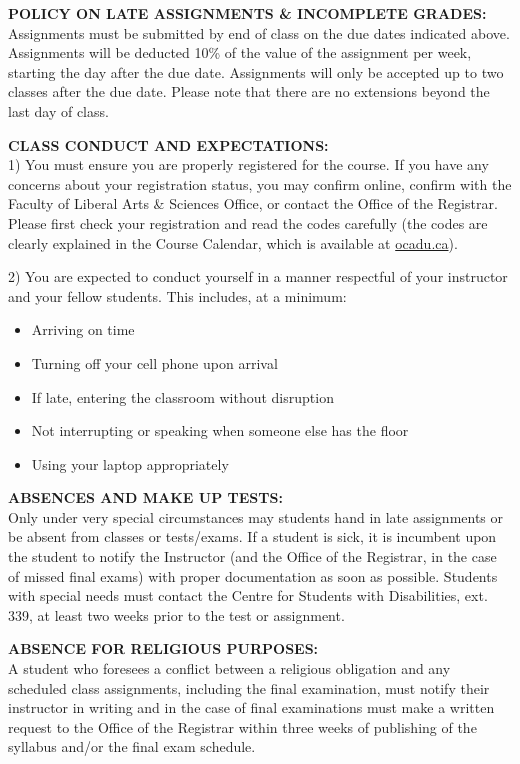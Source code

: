 \documentclass[10pt]{article}
\begin{document}
\textbf{POLICY ON LATE ASSIGNMENTS \& INCOMPLETE GRADES:}\\
Assignments must be submitted by end of class on the due dates indicated above. Assignments will be deducted 10\% of the value of the assignment per week, starting the day after the due date. Assignments will only be accepted up to two classes after the due date. Please note that there are no extensions beyond the last day of class.

\textbf{CLASS CONDUCT AND EXPECTATIONS:}\\
1) You must ensure you are properly registered for the course. If you have any concerns about your registration status, you may confirm online, confirm with the Faculty of Liberal Arts \& Sciences Office, or contact the Office of the Registrar. Please first check your registration and read the codes carefully (the codes are clearly explained in the Course Calendar, which is available at \href{http://www.ocadu.ca/services/records-and-registration/course-calendar-and-registration.htm}{ocadu.ca}).

2) You are expected to conduct yourself in a manner respectful of your instructor and your fellow students. This includes, at a minimum:
\begin{itemize}[noitemsep,topsep=0pt]
	\item Arriving on time
	\item Turning off your cell phone upon arrival
	\item If late, entering the classroom without disruption
	\item Not interrupting or speaking when someone else has the floor
	\item Using your laptop appropriately
\end{itemize}

\textbf{ABSENCES AND MAKE UP TESTS:}\\
Only under very special circumstances may students hand in late assignments or be absent from classes or tests/exams. If a student is sick, it is incumbent upon the student to notify the Instructor (and the Office of the Registrar, in the case of missed final exams) with proper documentation as soon as possible.  Students with special needs must contact the Centre for Students with Disabilities, ext. 339, at least two weeks prior to the test or assignment.

\textbf{ABSENCE FOR RELIGIOUS PURPOSES:}\\
A student who foresees a conflict between a religious obligation and any scheduled class assignments, including the final examination, must notify their instructor in writing and in the case of final examinations must make a written request to the Office of the Registrar within three weeks of publishing of the syllabus and/or the final exam schedule. 
\end{document}
